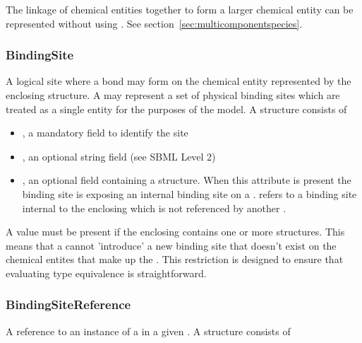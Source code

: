 \documentclass{cekarticle}
\begin{document}
The linkage of chemical entities together to form a larger chemical entity can be 
represented without using .  See section~\ref{sec:multicomponentspecies}.

\subsubsection{BindingSite}

A logical site where a bond may form on the chemical entity represented by the
enclosing  structure.  A  may represent a set of
physical binding sites which are treated as a single entity for the purposes of the model.  
A  structure consists of

\begin{itemize}

\item {}, a mandatory  field to identify the site

\item {}, an optional string field (see SBML Level 2)

\item {}, an optional field containing a
 structure.  When this attribute is present the binding site is
exposing an internal binding site on a .
 refers to a binding site internal to the enclosing
 which is not referenced by another .

\end{itemize}

A  value must be present if the enclosing 
contains one or more  structures.  This means that a
 cannot 'introduce' a new binding site that doesn't exist on
the chemical entites that make up the .  This restriction is designed to
ensure that evaluating type equivalence is straightforward.

\subsubsection{BindingSiteReference}

A reference to an instance of a  in a given .
A  structure consists of
\end{document}
